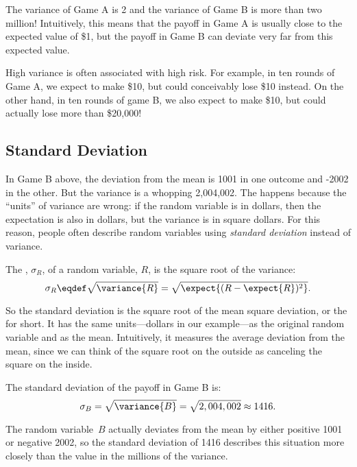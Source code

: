 The variance of Game A is 2 and the variance of Game B is more than
two million!  Intuitively, this means that the payoff in Game A is
usually close to the expected value of \$1, but the payoff in Game B
can deviate very far from this expected value.

High variance is often associated with high risk.  For example, in ten
rounds of Game A, we expect to make \$10, but could conceivably lose
\$10  instead.  On the other hand, in ten rounds of game B, we also
expect to make \$10, but could actually lose more than \$20,000!

\subsection{Standard Deviation}

In Game B above, the deviation from the mean is 1001 in one outcome
and -2002 in the other.  But the variance is a whopping 2,004,002.
The happens because the ``units'' of variance are wrong: if the random
variable is in dollars, then the expectation is also in dollars, but
the variance is in square dollars.  For this reason, people often
describe random variables using \emph{standard deviation} instead of
variance.

\begin{definition}
The , $\sigma_R$, of a random variable, $R$, is
the square root of the variance:
\[
\sigma_R \eqdef \sqrt{\variance{R}} = \sqrt{\expect{(R - \expect{R})^2}}.
\]      
\end{definition}

So the standard deviation is the square root of the mean square
deviation, or the  for short.  It has the same
units---dollars in our example---as the original random variable and
as the mean.  Intuitively, it measures the average deviation from the
mean, since we can think of the square root on the outside as
canceling the square on the inside.

\begin{example}
The standard deviation of the payoff in Game B is:
\[
    \sigma_B  = \sqrt{\variance{B}} = \sqrt{2,004,002} \approx 1416.
\]

The random variable~$B$ actually deviates from the mean by either
positive 1001 or negative 2002, so the standard deviation of 1416
describes this situation more closely than the value in the millions
of the variance.
\end{example}

